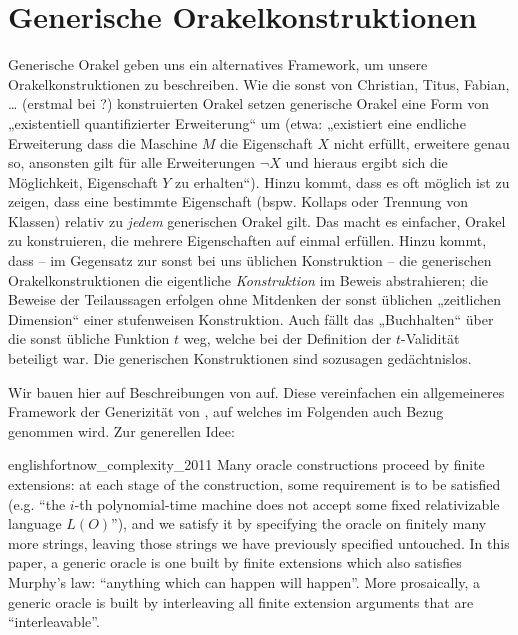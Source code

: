 \documentclass[nofonts]{uebung}
\theoremstyle{definition}
\begin{document}
\clearpage
\section{Generische Orakelkonstruktionen}

Generische Orakel geben uns ein alternatives Framework, um unsere Orakelkonstruktionen zu beschreiben. Wie die sonst von Christian, Titus, Fabian, \dots{} (erstmal bei \cite{dose_np-completeness_2019}?) konstruierten Orakel setzen generische Orakel eine Form von „existentiell quantifizierter Erweiterung“ um (etwa: „existiert eine endliche Erweiterung dass die Maschine $M$ die Eigenschaft $X$ nicht erfüllt, erweitere genau so, ansonsten gilt für alle Erweiterungen $\neg X$ und hieraus ergibt sich die Möglichkeit, Eigenschaft $Y$ zu erhalten“).
Hinzu kommt, dass es oft möglich ist zu zeigen, dass eine bestimmte Eigenschaft (bspw. Kollaps oder Trennung von Klassen) relativ zu \emph{jedem} generischen Orakel gilt. Das macht es einfacher, Orakel zu konstruieren, die mehrere Eigenschaften auf einmal erfüllen.
Hinzu kommt, dass -- im Gegensatz zur sonst bei uns üblichen Konstruktion  -- die generischen Orakelkonstruktionen die eigentliche \emph{Konstruktion} im Beweis abstrahieren; die Beweise der Teilaussagen erfolgen ohne Mitdenken der sonst üblichen „zeitlichen Dimension“ einer stufenweisen Konstruktion. Auch fällt das „Buchhalten“ über die sonst übliche Funktion $t$ weg, welche bei der Definition der $t$-Validität beteiligt war. Die generischen Konstruktionen sind sozusagen gedächtnislos.

Wir bauen hier auf Beschreibungen von \textcite{fortnow_complexity_2011} auf. Diese vereinfachen ein allgemeineres Framework der Generizität von \textcite{fenner_oracle_2003}, auf welches im Folgenden auch Bezug genommen wird.
Zur generellen Idee:

\begin{foreigndisplaycquote}{english}{fortnow_complexity_2011}
Many oracle constructions proceed by finite extensions: at each stage of the construction, some requirement is to be satisfied (e.g. “the $i$-th polynomial-time machine does not accept some fixed relativizable language $L(O)$”), and we satisfy it by specifying the oracle on finitely many more strings, leaving those strings we have previously specified untouched. In this paper, a generic oracle is one built by finite extensions which also satisfies Murphy’s law: “anything which can happen will happen”. More prosaically, a generic oracle is built by interleaving all finite extension arguments that are “interleavable”.
\end{foreigndisplaycquote}
\end{document}
